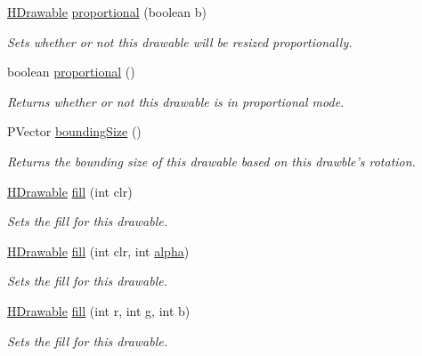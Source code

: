 \begin{DoxyCompactItemize}
\hyperlink{classhype_1_1drawable_1_1_h_drawable}{H\-Drawable} \hyperlink{classhype_1_1drawable_1_1_h_drawable_add4d7ddda7e479ab0c295ed5798ff313}{proportional} (boolean b)
\begin{DoxyCompactList}\small\item\em Sets whether or not this drawable will be resized proportionally. \end{DoxyCompactList}\item 
boolean \hyperlink{classhype_1_1drawable_1_1_h_drawable_a0b4162d5fbb7f045f84143beeafe4fb1}{proportional} ()
\begin{DoxyCompactList}\small\item\em Returns whether or not this drawable is in proportional mode. \end{DoxyCompactList}\item 
P\-Vector \hyperlink{classhype_1_1drawable_1_1_h_drawable_a70e91337f0ceafe27f5119e12063cc8e}{bounding\-Size} ()
\begin{DoxyCompactList}\small\item\em Returns the bounding size of this drawable based on this drawble's rotation. \end{DoxyCompactList}\item 
\hyperlink{classhype_1_1drawable_1_1_h_drawable}{H\-Drawable} \hyperlink{classhype_1_1drawable_1_1_h_drawable_aa0d3bfb3c918f18674b49bb6af4ec46b}{fill} (int clr)
\begin{DoxyCompactList}\small\item\em Sets the fill for this drawable. \end{DoxyCompactList}\item 
\hyperlink{classhype_1_1drawable_1_1_h_drawable}{H\-Drawable} \hyperlink{classhype_1_1drawable_1_1_h_drawable_a2448e52613f3bc717d251ad7320cf383}{fill} (int clr, int \hyperlink{classhype_1_1drawable_1_1_h_drawable_a03c7275f5caab5cc9034b18d4c2f1305}{alpha})
\begin{DoxyCompactList}\small\item\em Sets the fill for this drawable. \end{DoxyCompactList}\item 
\hyperlink{classhype_1_1drawable_1_1_h_drawable}{H\-Drawable} \hyperlink{classhype_1_1drawable_1_1_h_drawable_a675e37a29753adbabf891e7f51ea5508}{fill} (int r, int g, int b)
\begin{DoxyCompactList}\small\item\em Sets the fill for this drawable. \end{DoxyCompactList}\item 

\end{DoxyCompactItemize}
